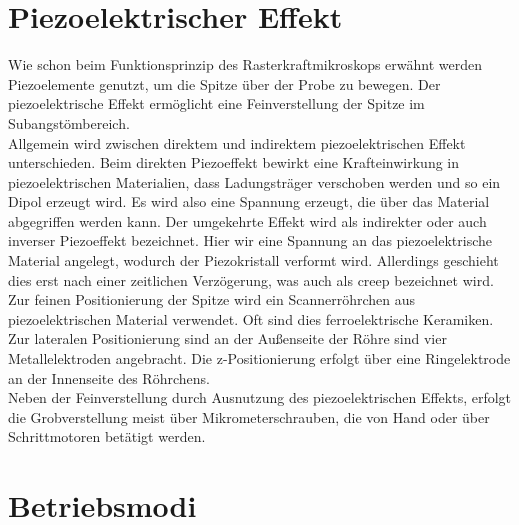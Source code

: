 \section{Piezoelektrischer Effekt}
Wie schon beim Funktionsprinzip des Rasterkraftmikroskops erwähnt werden Piezoelemente genutzt, um die Spitze über der Probe zu bewegen. Der piezoelektrische Effekt ermöglicht eine Feinverstellung der Spitze im Subangstömbereich.  \\
Allgemein wird zwischen direktem und indirektem piezoelektrischen Effekt unterschieden. Beim direkten Piezoeffekt bewirkt eine Krafteinwirkung in piezoelektrischen Materialien, dass Ladungsträger verschoben werden und so ein Dipol erzeugt wird. Es wird also eine Spannung erzeugt, die über das Material abgegriffen werden kann. Der umgekehrte Effekt wird als indirekter oder auch inverser Piezoeffekt bezeichnet. Hier wir eine Spannung an das piezoelektrische Material angelegt, wodurch der Piezokristall verformt wird. Allerdings geschieht dies erst nach einer zeitlichen Verzögerung, was auch als \glqq creep\grqq{} bezeichnet wird.  \\
Zur feinen Positionierung der Spitze wird ein Scannerröhrchen aus piezoelektrischen Material verwendet. Oft sind dies ferroelektrische Keramiken. Zur lateralen Positionierung sind an der Außenseite der Röhre sind vier Metallelektroden angebracht. Die z-Positionierung erfolgt über eine Ringelektrode an der Innenseite des Röhrchens.
\\
Neben der Feinverstellung durch Ausnutzung des piezoelektrischen Effekts, erfolgt die Grobverstellung meist über Mikrometerschrauben, die von Hand oder über Schrittmotoren betätigt werden.


\section{Betriebsmodi}
